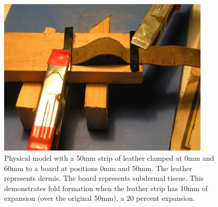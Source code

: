 %

\begin{figure}[!h]
  \centering
   \includegraphics[width=0.9\textwidth]{images/P1010004.JPG}
  \caption{Physical model with a 50mm strip of leather clamped at 0mm and 60mm to a board at positions 0mm and 50mm. The leather represents dermis. The board represents subdermal tissue. This demonstrates fold formation when the leather strip has 10mm of expansion (over the original 50mm), a 20 percent expansion.}
  \label{fig:model2}
\end{figure}

%

